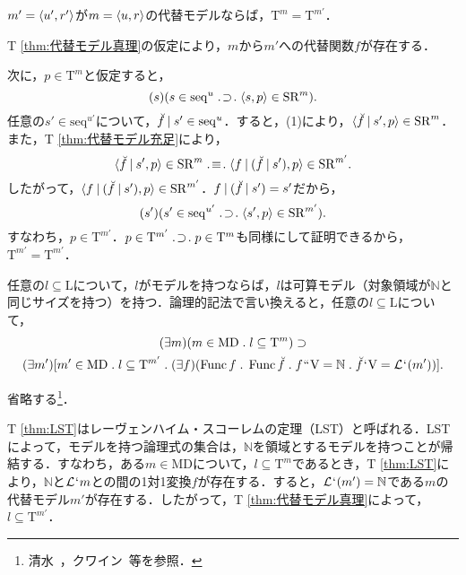\begin{thm}
\label{thm:代替モデル真理}
$ m' = \langle u',r' \rangle $が$ m = \langle u,r \rangle $の代替モデルならば，$\mathrm{T}^{m} = \mathrm{T}^{m'}$．
\end{thm}
\begin{pfx}
\setcounter{equation}{0}
T \ref{thm:代替モデル真理}の仮定により，$m$から$m'$への代替関数$ f $が存在する．

次に，$p\in\mathrm{T}^{m}$と仮定すると，
\begin{equation}
    (s)(s\in\mathrm{seq}^{u}\case{1}{1}{1}\orp{s,p}\in\mathrm{SR}^{m}).
\end{equation}
任意の$s'\in \mathrm{seq}^{u'}$について，$ \breve{f}\mathbin{\mid} s'\in \mathrm{seq}^{u} $．すると，(1)により，$ \langle \breve{f}\mathbin{\mid} s',p \rangle\in\mathrm{SR}^{m} $．また，T \ref{thm:代替モデル充足}により，
\[
   \orp{\breve{f}\resl s',p}\in\mathrm{SR}^{m}\case{3}{1}{1}\orp{f\resl(\breve{f}\resl s'),p}\in\mathrm{SR}^{m'}.
\]
したがって，$ \langle f\mathbin{\mid}(\breve{f}\mathbin{\mid} s'),p \rangle\in\mathrm{SR}^{m'} $．$ f\mathbin{\mid}(\breve{f}\mathbin{\mid} s') = s' $だから，
\begin{equation*}
    (s')(s'\in\mathrm{seq}^{u'}\case{1}{1}{1}\orp{s',p}\in\mathrm{SR}^{m'}).
\end{equation*}
すなわち，$ p\in\mathrm{T}^{m'} $．$ p\in\mathrm{T}^{m'}\case{1}{1}{1}p\in\mathrm{T}^{m} $も同様にして証明できるから，$ \mathrm{T}^{m'}=\mathrm{T}^{m'} $．
\end{pfx}

\begin{thm}
\label{thm:LST}
任意の$ l\subseteq\mathrm{L} $について，$l$がモデルを持つならば，$l$は可算モデル（対象領域が$\mathbb{N}$と同じサイズを持つ）を持つ．論理的記法で言い換えると，任意の$ l\subseteq\mathrm{L} $について，
\begin{multline*}
    (\exists m)(m\in\mathrm{MD}\con{1}l\subseteq \mathrm{T}^{m})\case{1}{0}{0}\\
    (\exists m')[
        m'\in\mathrm{MD}\con{1}l\subseteq \mathrm{T}^{m'}\con{1}
        (\exists f)(\func f\con{1}\func\breve{f}\con{1}f\img\univ = \mathbb{N}\con{1}\breve{f}\fap\univ = \mathcal{L}\fap(m'))
    ].
\end{multline*}
\end{thm}
\begin{pf}
    省略する\footnote{
        清水~\cite[p.\,131]{清水}，クワイン~\cite[pp.\,190--193]{クワインb}等を参照．
    }．
\end{pf}

\noindent T \ref{thm:LST}はレーヴェンハイム・スコーレムの定理（LST）と呼ばれる．LSTによって，モデルを持つ論理式の集合は，$\mathbb{N}$を領域とするモデルを持つことが帰結する．すなわち，ある$m\in\mathrm{MD}$について，$ l\subseteq\mathrm{T}^{m} $であるとき，T \ref{thm:LST}により，$ \mathbb{N} $と$\mathcal{L}{\mspace{1mu}{`}\mspace{1mu}} m$との間の1対1変換$f$が存在する．すると，$ \mathcal{L}{\mspace{1mu}{`}\mspace{1mu}} (m') = \mathbb{N} $である$m$の代替モデル$m'$が存在する．したがって，T \ref{thm:代替モデル真理}によって，$l\subseteq\mathrm{T}^{m'} $．


